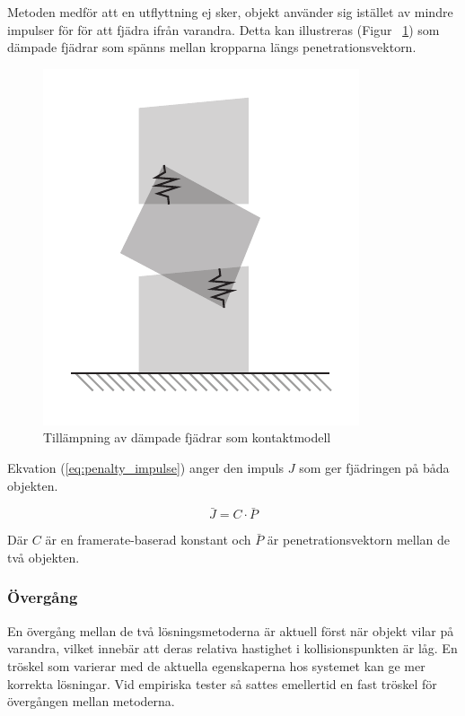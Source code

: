 \documentclass[a4paper,12pt,twopage,swedish]{article}
\begin{document}
Metoden medför att en utflyttning ej sker, objekt använder sig istället av mindre impulser för för att fjädra ifrån varandra. Detta kan illustreras (Figur ~\ref{fig:penalty}) som dämpade fjädrar som spänns mellan kropparna längs penetrationsvektorn.

\begin{figure}[H]
	\centering
	\includegraphics{illustrations/penalty.pdf}
	\caption{Tillämpning av dämpade fjädrar som kontaktmodell}
	\label{fig:penalty}
\end{figure}

Ekvation (\ref{eq:penalty_impulse}) anger den impuls $J$ som ger fjädringen på båda objekten.

\begin{equation}\label{eq:penalty_impulse}
\bar{J} = C \cdot \bar{P}
\end{equation}

Där $C$ är en framerate-baserad konstant och $\bar{P}$ är penetrationsvektorn mellan de två objekten.

\subsubsection{Övergång}
En övergång mellan de två lösningsmetoderna är aktuell först när objekt vilar på varandra, vilket innebär att deras relativa hastighet i kollisionspunkten är låg.
En tröskel som varierar med de aktuella egenskaperna hos systemet kan ge mer korrekta lösningar. Vid empiriska tester så sattes emellertid en fast tröskel för övergången mellan metoderna.
\end{document}

